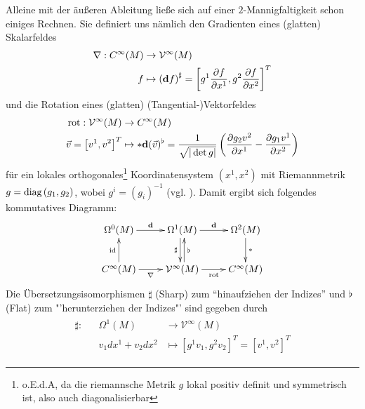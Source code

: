   Alleine mit der äußeren Ableitung ließe sich auf einer \( 2 \)-Mannigfaltigkeit schon einiges Rechnen.
  Sie definiert uns nämlich den Gradienten eines (glatten) Skalarfeldes 
  \begin{align}
    \begin{aligned}
      \nabla: C^{\infty}(M) &\rightarrow \mathcal{V}^{\infty}(M) \\
                            f  &\mapsto \left( \mathbf{d} f \right)^{\sharp}
                                        = \left[ g^{1} \frac{\partial f}{\partial x^{1}}, g^{2} \frac{\partial f}{\partial x^{2}} \right]^{T}
    \end{aligned}
  \end{align}
  und die Rotation eines (glatten) (Tangential-)Vektorfeldes
  \begin{align}
    \begin{aligned}
      \text{rot}: \mathcal{V}^{\infty}(M) &\rightarrow C^{\infty}(M) \\
                \vec{v} = \left[ v^{1}, v^{2} \right]^{T} &\mapsto * \mathbf{d} (\vec{v})^{\flat}
                                                           = \frac{1}{\sqrt{|\det g|}}\left( \frac{\partial g_{2}v^{2}}{\partial x^{1}} -  \frac{\partial g_{1}v^{1}}{\partial x^{2}}\right)
    \end{aligned}
  \end{align}
  für ein lokales orthogonales\footnote{o.E.d.A, da die riemannsche Metrik \( g  \) lokal positiv definit und symmetrisch ist, also auch diagonalisierbar} 
  Koordinatensystem \( (x^{1}, x^{2}) \) mit Riemannmetrik \( g = \text{diag}\left( g_{1},g_{2} \right) \), wobei \( g^{i}=(g_{i})^{-1} \) (vgl. \cite{nitschke}). 
  Damit ergibt sich folgendes kommutatives Diagramm:
  \begin{align}
    \label{diag2DimAusAbleitung}
    \begin{xy} \xymatrix{
      \Omega^{0}(M) \ar[r]^{\exd} & \Omega^{1}(M) \ar[r]^{\exd} \ar@<-2pt>[d]_{\sharp} & \Omega^{2}(M) \ar[d]^{*}\\
      C^{\infty}(M) \ar[r]_{\nabla} \ar[u]^{\text{id}} & \mathcal{V}^{\infty}(M) \ar[r]_{\text{rot}} \ar@<-2pt>[u]_{\flat} & C^{\infty}(M) }
    \end{xy}
  \end{align}
  Die Übersetzungsisomorphismen \( \sharp \) (Sharp) zum "`hinaufziehen der Indizes"' und \( \flat \) (Flat) zum "'herunterziehen der Indizes"' sind gegeben durch
  \begin{align}
    \begin{aligned}
      \sharp:&& \Omega^{1}(M) &\rightarrow \mathcal{V}^{\infty}(M) \\
            &&   v_{1} dx^{1} + v_{2} dx^{2} &\mapsto \left[ g^{1}v_{1}, g^{2}v_{2} \right]^{T} = \left[ v^{1}, v^{2} \right]^{T}
    \end{aligned}
  \end{align}
